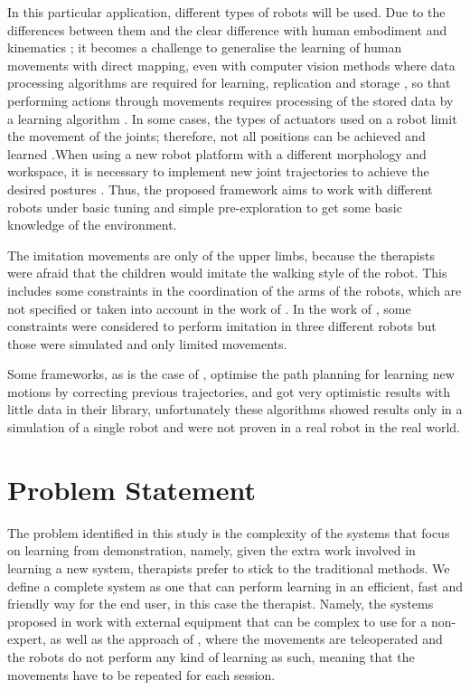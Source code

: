 \documentclass[thesis]{mas_proposal}
\begin{document}
	In this particular application, different types of robots will be used. Due to the differences between them and the clear difference with human embodiment and kinematics \cite{Koenemann2012}; it becomes a challenge to generalise the learning of human movements with direct mapping, even with computer vision methods where data processing algorithms are required for learning, replication and storage \cite{Liu2015}, so that performing actions through movements requires processing of the stored data by a learning algorithm \cite{Kober2010}. In some cases, the types of actuators used on a robot limit the movement of the joints; therefore, not all positions can be achieved and learned \cite{Almalki2020}.When using a new robot platform with a different morphology and workspace, it is necessary to implement new joint trajectories to achieve the desired postures \cite{VanPerre2015}. Thus, the proposed framework aims to work with different robots under basic tuning and simple pre-exploration to get some basic knowledge of the environment. 
		
	The imitation movements are only of the upper limbs, because the therapists were afraid that the children would imitate the walking style of the robot. This includes some constraints in the coordination of the arms of the robots, which are not specified or taken into account in the work of \cite{Liu2015, Fadli2018, Suleiman2008}. In the work of \cite{VanPerre2015}, some constraints were considered to perform imitation in three different robots but those were simulated and only limited movements.
		
	Some frameworks, as is the case of \cite{Berenson2012, Coleman2015}, optimise the path planning for learning new motions by correcting previous trajectories, and got very optimistic results with little data in their library, unfortunately these algorithms showed results only in a simulation of a single robot and were not proven in a real robot in the real world. 
	
\section{Problem Statement}
	
	The problem identified in this study is the complexity of the systems that focus on learning from demonstration, namely, given the extra work involved in learning a new system, therapists prefer to stick to the traditional methods. We define a complete system as one that can perform learning in an efficient, fast and friendly way for the end user, in this case the therapist. Namely, the systems proposed in \cite{Hua2021, Koenemann2012} work with external equipment that can be complex to use for a non-expert, as well as the approach of \cite{Si2021, Assad2020, Kulikovskiy2021}, where the movements are teleoperated and the robots do not perform any kind of learning as such, meaning that the movements have to be repeated for each session.
	
\end{document}
